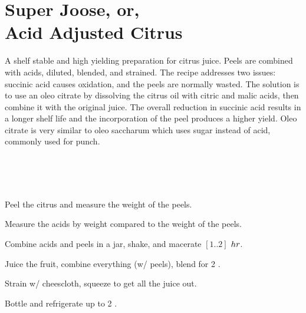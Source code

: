 \section[Super Joose]{Super Joose, or,\\Acid Adjusted Citrus}

\begin{recipestats}[
	servings=$\approx 12$ \fluidounce,
	preptime=30 \minute,
	inactivetime=2 \hour,
	original=\citeauthor{superJuiceKos}\cite{superJuiceKos},
]
\end{recipestats}


\begin{recipeabstract}
	A shelf stable and high yielding preparation for citrus juice.
	Peels are combined with acids, diluted, blended, and strained.
	The recipe addresses two issues: succinic acid causes oxidation, and the peels are normally wasted.
	The solution is to use an oleo citrate by dissolving the citrus oil with citric and malic acids, then combine it with the original juice.
	The overall reduction in succinic acid results in a longer shelf life and the incorporation of the peel produces a higher yield.
	Oleo citrate is very similar to oleo saccharum which uses sugar instead of acid, commonly used for punch\cite{oleoSaccharum}.
\end{recipeabstract}


\begin{ingredientcolumns}[1]
	\begin{ingredientblock}
		\\
		\\
		\\
	\end{ingredientblock}
\end{ingredientcolumns}


\begin{preparation}
\item Peel the citrus and measure the weight of the peels.
\item Measure the acids by weight compared to the weight of the peels.
\item Combine acids and peels in a jar, shake, and macerate $[1..2]$ $\hour$.
\item Juice the fruit, combine everything (w/ peels), blend for 2 \minute.
\item Strain w/ cheescloth, squeeze to get all the juice out.
\item Bottle and refrigerate up to 2 \week.
\end{preparation}


